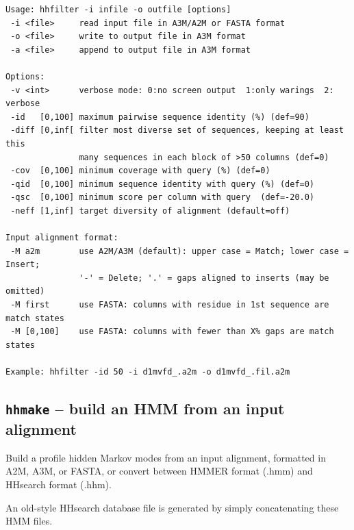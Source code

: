 \documentclass[11pt,a4paper]{article}
\begin{document}
\small 
\begin{verbatim}
Usage: hhfilter -i infile -o outfile [options]                  
 -i <file>     read input file in A3M/A2M or FASTA format                 
 -o <file>     write to output file in A3M format                         
 -a <file>     append to output file in A3M format                        

Options:                                                                  
 -v <int>      verbose mode: 0:no screen output  1:only warings  2: verbose
 -id   [0,100] maximum pairwise sequence identity (%) (def=90)   
 -diff [0,inf[ filter most diverse set of sequences, keeping at least this    
               many sequences in each block of >50 columns (def=0)
 -cov  [0,100] minimum coverage with query (%) (def=0) 
 -qid  [0,100] minimum sequence identity with query (%) (def=0) 
 -qsc  [0,100] minimum score per column with query  (def=-20.0)
 -neff [1,inf] target diversity of alignment (default=off)

Input alignment format:                                                    
 -M a2m        use A2M/A3M (default): upper case = Match; lower case = Insert;
               '-' = Delete; '.' = gaps aligned to inserts (may be omitted)   
 -M first      use FASTA: columns with residue in 1st sequence are match states
 -M [0,100]    use FASTA: columns with fewer than X% gaps are match states   
                                                                          
Example: hhfilter -id 50 -i d1mvfd_.a2m -o d1mvfd_.fil.a2m      
\end{verbatim} 
\normalsize


\subsection{{\tt hhmake} -- build an HMM from an input alignment}

Build a profile hidden Markov modes from an input alignment, formatted 
in A2M, A3M, or FASTA, or convert between HMMER format (.hmm) and 
HHsearch format (.hhm).   

An old-style HHsearch database file is generated by simply concatenating these 
HMM files.  
\end{document}
